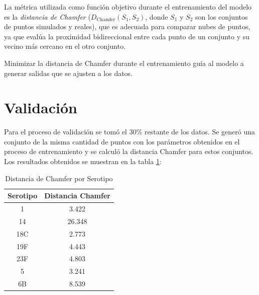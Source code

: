 La métrica utilizada como función objetivo durante el entrenamiento del modelo es la \textit{distancia de Chamfer} ($D_{\mathrm{Chamfer}}(S_1, S_2)$, donde \( S_1 \) y \( S_2 \) son los conjuntos de puntos simulados y reales), que es adecuada para comparar nubes de puntos, ya que evalúa la proximidad bidireccional entre cada punto de un conjunto y su vecino más cercano en el otro conjunto.

Minimizar la distancia de Chamfer durante el entrenamiento guía al modelo a generar salidas que se ajusten a los datos.


\section{Validación}
Para el proceso de validación se tomó el 30\% restante de los datos. Se generó una conjunto de la misma cantidad de puntos con los parámetros obtenidos en el proceso de entrenamiento y se calculó la distancia Chamfer para estos conjuntos. Los resultados obtenidos se muestran en la tabla \ref{tab:chamfer_serotipos}:

\begin{table}[h]
\centering
\caption{Distancia de Chamfer por Serotipo}
\begin{tabular}{|c|c|}
\hline
\textbf{Serotipo} & \textbf{Distancia Chamfer} \\
\hline
1   & 3.422  \\
14  & 26.348 \\
18C & 2.773  \\
19F & 4.443  \\
23F & 4.803  \\
5   & 3.241  \\
6B  & 8.539  \\
\hline
\end{tabular}
\label{tab:chamfer_serotipos}
\end{table}

